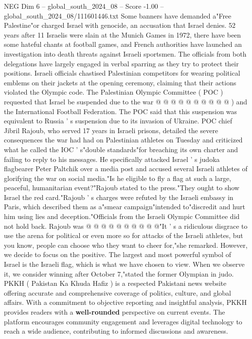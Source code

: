 \begin{textsample}{NEG Dim 6 – global\_south\_2024\_08 – Score -1.00 – global\_south\_2024\_08/111601446.txt}
Some banners have demanded a"Free Palestine"or charged Israel with genocide, an accusation that Israel denies. 52 years after 11 Israelis were slain at the Munich Games in 1972, there have been some hateful chants at football games, and French authorities have launched an investigation into death threats against Israeli sportsmen.
The officials from both delegations have largely engaged in verbal sparring as they try to protect their positions.
Israeli officials chastised Palestinian competitors for wearing political emblems on their jackets at the opening ceremony, claiming that their actions violated the Olympic code.
The Palestinian Olympic Committee ( POC ) requested that Israel be suspended due to the war @ @ @ @ @ @ @ @ @ @ ) and the International Football Federation.
The POC said that this suspension was equivalent to Russia ' s suspension due to its invasion of Ukraine.
POC chief Jibril Rajoub, who served 17 years in Israeli prisons, detailed the severe consequences the war had had on Palestinian athletes on Tuesday and criticized what he called the IOC ' s"double standards"for breaching its own charter and failing to reply to his messages.
He specifically attacked Israel ' s judoka flagbearer Peter Paltchik over a media post and accused several Israeli athletes of glorifying the war on social media."Is he eligible to fly a flag at such a large, peaceful, humanitarian event?"Rajoub stated to the press."They ought to show Israel the red card."Rajoub ' s charges were refuted by the Israeli embassy in Paris, which described them as a"smear campaign"intended to"discredit and hurt him using lies and deception."Officials from the Israeli Olympic Committee did not hold back.
Rajoub was @ @ @ @ @ @ @ @ @ @"It ' s a ridiculous disgrace to use the arena for political or even more so for attacks of the Israeli athletes, but you know, people can choose who they want to cheer for,"she remarked.
However, we decide to focus on the positive.
The largest and most powerful symbol of Israel is the Israeli flag, which is what we have chosen to view.
When we observe it, we consider winning after October 7,"stated the former Olympian in judo.
PKKH ( Pakistan Ka Khuda Hafiz ) is a respected Pakistani news website offering accurate and comprehensive coverage of politics, culture, and global affairs.
With a commitment to objective reporting and insightful analysis, PKKH provides readers with a \textbf{well-rounded} perspective on current events.
The platform encourages community engagement and leverages digital technology to reach a wide audience, contributing to informed discussions and awareness.

\end{textsample}
